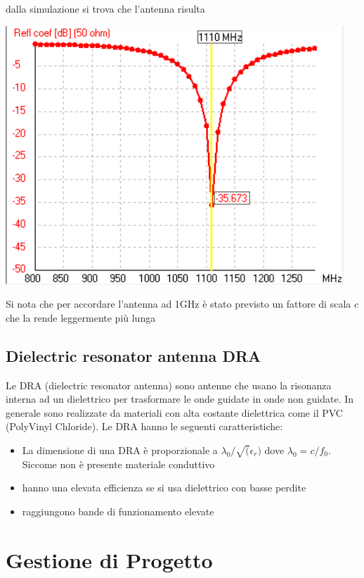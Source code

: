 \documentclass[10pt,a4paper]{book}
\begin{document}
dalla simulazione si trova che l'antenna risulta 
\begin{center}
\includegraphics[scale=1]{img/Antenne/rectangular_loop_return_loss.png} 
\end{center}

Si nota che per accordare l'antenna ad 1GHz è stato previsto un fattore di scala $c$ che la rende leggermente più lunga
\section{Dielectric resonator antenna DRA}
Le DRA (dielectric resonator antenna) sono antenne che usano la risonanza interna ad un dielettrico per trasformare le onde guidate in onde non guidate. In generale sono realizzate da materiali con alta costante dielettrica come il PVC (PolyVinyl Chloride).
Le DRA hanno le seguenti caratteristiche:

\begin{itemize}
\item La dimensione di una DRA è proporzionale a $\lambda_0/ \sqrt(\epsilon_r)$ dove $\lambda_0 = c / f_0$. Siccome non è presente materiale conduttivo
\item hanno una elevata efficienza se si usa dielettrico con basse perdite
\item raggiungono bande di funzionamento elevate
\end{itemize}

\chapter{Gestione di Progetto}
\end{document}
